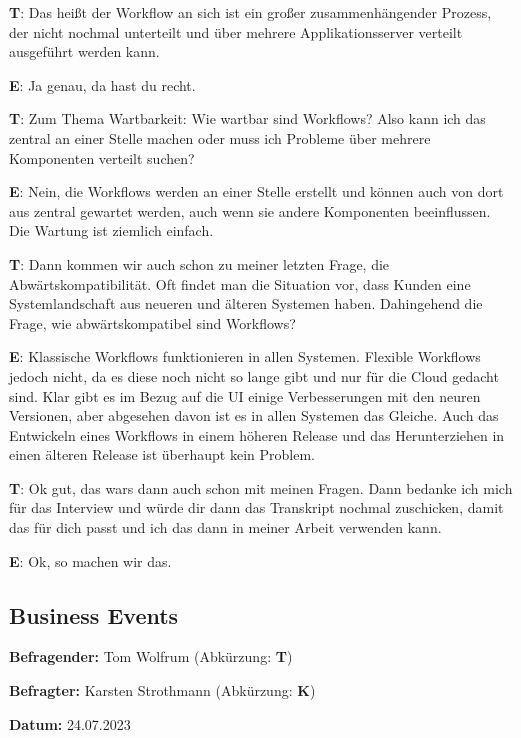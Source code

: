 \begin{list}{X:}{\setlength{\labelsep}{5mm}}
    \item[\textbf{T}:] Das hei{\ss}t der Workflow an sich ist ein gro{\ss}er zusammenhängender Prozess, der nicht nochmal unterteilt und über mehrere Applikationsserver verteilt ausgeführt werden kann.
    \item[\textbf{E}:] Ja genau, da hast du recht.
    \item[\textbf{T}:] Zum Thema Wartbarkeit: Wie wartbar sind Workflows? Also kann ich das zentral an einer Stelle machen oder muss ich Probleme über mehrere Komponenten verteilt suchen?
    \item[\textbf{E}:] Nein, die Workflows werden an einer Stelle erstellt und können auch von dort aus zentral gewartet werden, auch wenn sie andere Komponenten beeinflussen. Die Wartung ist ziemlich einfach.
    \item[\textbf{T}:] Dann kommen wir auch schon zu meiner letzten Frage, die Abwärtskompatibilität. Oft findet man die Situation vor, dass Kunden eine Systemlandschaft aus neueren und älteren Systemen haben. Dahingehend die Frage, wie abwärtskompatibel sind Workflows?
    \item[\textbf{E}:] Klassische Workflows funktionieren in allen Systemen. Flexible Workflows jedoch nicht, da es diese noch nicht so lange gibt und nur für die Cloud gedacht sind. Klar gibt es im Bezug auf die UI einige Verbesserungen mit den neuren Versionen, aber abgesehen davon ist es in allen Systemen das Gleiche. Auch das Entwickeln eines Workflows in einem höheren Release und das Herunterziehen in einen älteren Release ist überhaupt kein Problem.
    \item[\textbf{T}:] Ok gut, das wars dann auch schon mit meinen Fragen. Dann bedanke ich mich für das Interview und würde dir dann das Transkript nochmal zuschicken, damit das für dich passt und ich das dann in meiner Arbeit verwenden kann.
    \item[\textbf{E}:] Ok, so machen wir das.
\end{list}

\subsection{Business Events} \label{T_Business-Events}

\textbf{Befragender:} Tom Wolfrum (Abkürzung: \textbf{T})

\textbf{Befragter:} Karsten Strothmann (Abkürzung: \textbf{K})

\textbf{Datum:} 24.07.2023

